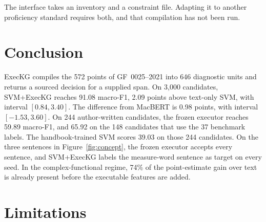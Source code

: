 \documentclass[pdflatex,sn-mathphys,NameDate]{sn-jnl}
\begin{document}
The interface takes an inventory and a constraint file.
Adapting it to another proficiency standard requires both, and that compilation has not been run.

\section{Conclusion}
\label{sec:conclusion}

ExecKG compiles the 572 points of GF~0025--2021 into 646 diagnostic units and returns a sourced decision for a supplied span.
On 3,000 candidates, SVM+ExecKG reaches 91.08 macro-F1, 2.09 points above text-only SVM, with interval $[0.84, 3.40]$.
The difference from MacBERT is 0.98 points, with interval $[-1.53, 3.60]$.
On 244 author-written candidates, the frozen executor reaches 59.89 macro-F1, and 65.92 on the 148 candidates that use the 37 benchmark labels.
The handbook-trained SVM scores 39.03 on those 244 candidates.
On the three sentences in Figure~\ref{fig:concept}, the frozen executor accepts every sentence, and SVM+ExecKG labels the measure-word sentence as target on every seed.
In the complex-functional regime, 74\% of the point-estimate gain over text is already present before the executable features are added.

\section{Limitations}
\label{sec:limits}
\end{document}
